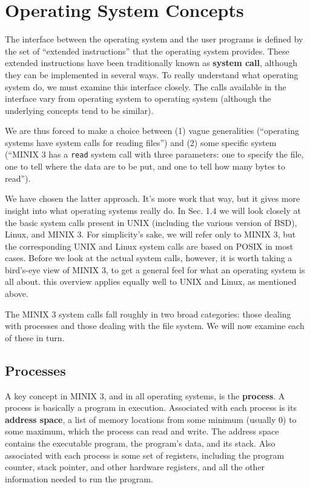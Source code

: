 \documentclass{book}
\newcommand {\kw}  [1] {\textbf{#1}}
\newcommand {\cmd} [1] {\texttt{#1}}
\begin{document}
\section{Operating System Concepts}
The interface between the operating system and the user programs is defined by the set of ``extended instructions'' that the operating system provides.
These extended instructions have been traditionally known as \kw{system call}, although they can be implemented in several ways.
To really understand what operating system do, we must examine this interface closely.
The calls available in the interface vary from operating system to operating system (although the underlying concepts tend to be similar).

We are thus forced to make a choice between (1) vague generalities (``operating systems have system calls for reading files'')
and (2) some specific system (``MINIX 3 has a \cmd{read} system call with three parameters: 
one to specify the file, one to tell where the data are to be put, and one to tell how many bytes to read'').

We have chosen the latter approach.
It's more work that way, but it gives more insight into what operating systems really do.
In Sec. 1.4 we will look closely at the basic system calls present in UNIX (including the various version of BSD), Linux, and MINIX 3.
For simplicity's sake, we will refer only to MINIX 3, but the corresponding UNIX and Linux system calls are based on POSIX in most cases.
Before we look at the actual system calls, however, it is worth taking a bird's-eye view of MINIX 3, 
to get a general feel for what an operating system is all about.
this overview applies equally well to UNIX and Linux, as mentioned above.

The MINIX 3 system calls fall roughly in two broad categories: those dealing with processes and those dealing with the file system.
We will now examine each of these in turn.

\subsection{Processes}
A key concept in MINIX 3, and in all operating systems, is the \kw{process}.
A process is basically a program in execution.
Associated with each process is its \kw{address space}, a list of memory locations from some minimum (usually 0) to some maximum,
which the process can read and write.
The address space contains the executable program, the program's data, and its stack.
Also associated with each process is some set of registers, including the program counter, stack pointer, and other hardware registers, 
and all the other information needed to run the program.
 
\end{document}

